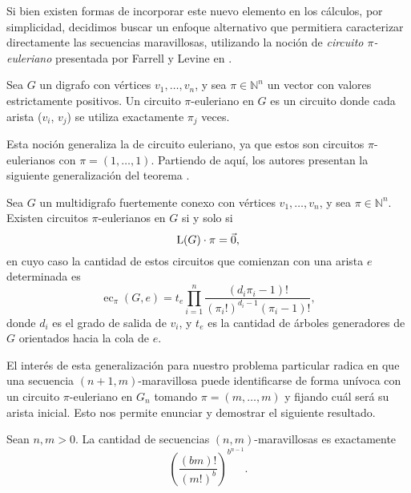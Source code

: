 Si bien existen formas de incorporar este nuevo elemento en los cálculos,
por simplicidad, decidimos buscar un enfoque alternativo que
permitiera caracterizar directamente las secuencias maravillosas, utilizando la
noción de \emph{circuito $\pi$-euleriano} presentada por Farrell y Levine en
\cite{farrell-multi-eulerian-tours}.

\begin{definition}
	Sea $G$ un digrafo con vértices $v_1, \dots, v_n$, y sea $\pi \in
		\mathbb{N}^n$
	un vector con valores estrictamente positivos.
	Un circuito $\pi$-euleriano en $G$ es un circuito donde cada arista
	($v_i$, $v_j$) se utiliza exactamente $\pi_j$ veces.
\end{definition}

Esta noción generaliza la de circuito euleriano, ya que estos son circuitos
$\pi$-eulerianos con $\pi = (1, \dots, 1)$.
Partiendo de aquí, los autores presentan la siguiente generalización del
teorema \BEST{}.

\begin{theorem*}
	\label{prop:BEST-generalized}
	Sea $G$ un multidigrafo fuertemente conexo con vértices $v_1, \dots, v_n$, y
	sea $\pi \in \mathbb{N}^n$.
	Existen circuitos $\pi$-eulerianos en $G$ si y solo si
	\[ \operatorname{L}(G) \cdot \pi = \vec{0}, \]
	en cuyo caso la cantidad de estos circuitos que comienzan con una arista $e$
	determinada es
	\[ \operatorname{ec}_\pi(G, e) = t_e
		\prod_{i=1}^n \frac{(d_i\pi_i - 1)! }{(\pi_i!)^{d_i-1}(\pi_i-1)!}, \]
	donde $d_i$ es el grado de salida de $v_i$, y $t_e$ es la cantidad de árboles
	generadores de $G$ orientados hacia la cola de $e$.
\end{theorem*}

El interés de esta generalización para nuestro problema particular radica en que
una secuencia $(n+1,m)$-maravillosa puede identificarse de forma unívoca con un
circuito $\pi$-euleriano en $G_n$ tomando $\pi = (m,\dots,m)$ y fijando cuál
será su arista inicial.
Esto nos permite enunciar y demostrar el siguiente resultado.

\begin{proposition}
	\label{proposition:marvellous-count}
	Sean $n, m > 0$.
	La cantidad de secuencias $(n,m)$-maravillosas es exactamente
	\[ \left( \frac{(bm)! }{(m!)^b} \right)^{b^{n-1}}. \]
\end{proposition}

